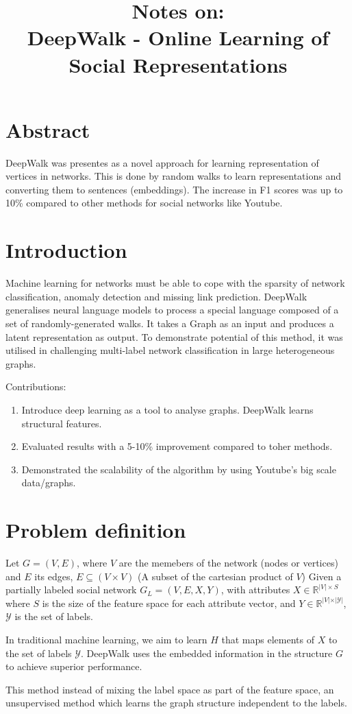 \documentclass{article}
\title{\textbf{Notes on:}\\ DeepWalk - Online Learning of Social Representations}
\begin{document}
\maketitle{}

\section{Abstract}
DeepWalk was presentes as a novel approach for learning representation of
vertices in networks. This is done by random walks to learn representations and
converting them to sentences (embeddings). The increase in F1 scores was up to
10\% compared to other methods for social networks like Youtube.

\section{Introduction}
Machine learning for networks must be able to cope with the sparsity of network
classification, anomaly detection and missing link prediction. 
DeepWalk generalises neural language models to process a special language
composed of a set of randomly-generated walks. It takes a Graph as an input
and produces a latent representation as output.
To demonstrate potential of this method, it was utilised in challenging
multi-label network classification in large heterogeneous graphs.

Contributions:
\begin{enumerate}
  \item Introduce deep learning as a tool to analyse graphs. DeepWalk learns structural 
    features.
  \item Evaluated results with a 5-10\% improvement compared to toher methods.
  \item Demonstrated the scalability of the algorithm by using Youtube's big scale data/graphs.
\end{enumerate}

\section{Problem definition}
Let $G = (V,E)$, where $V$ are the memebers of the network (nodes or
vertices) and $E$ its edges, $E \subseteq (V \times V)$ (A subset of the
cartesian product of $V$) Given a partially labeled social network $G_{L} =
(V,E,X,Y)$, with attributes $X \in \mathbb{R}^{\vert V \vert \times S}$
where $S$ is the size of the feature space for each attribute vector, and
$Y \in \mathbb{R}^{\vert V \vert \times \vert \mathcal{Y} \vert} $, $\mathcal{Y}$
is the set of labels.

In traditional machine learning, we aim to learn $H$ that maps elements of $X$
to the set of labels $\mathcal{Y}$. DeepWalk uses the embedded information in the structure $G$
to achieve superior performance.


This method instead of mixing the label space as part of the feature space, an unsupervised
method which learns the graph structure independent to the labels.
\end{document}
